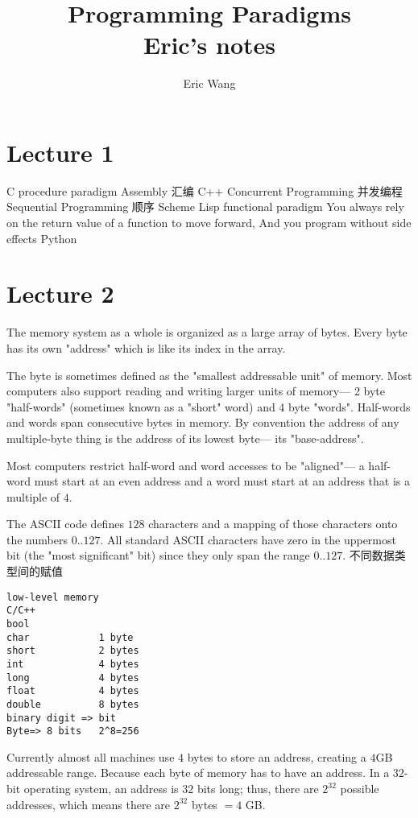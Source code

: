\documentclass{article}
\begin{document}
\title{Programming Paradigms\\ Eric's notes}
\author{Eric Wang}
\maketitle
\newpage
\tableofcontents
\newpage
\section{Lecture 1}
C procedure paradigm
Assembly 汇编
C++
Concurrent Programming 并发编程
Sequential Programming 顺序
Scheme Lisp functional paradigm
You always rely on the return value of a function to move forward, And you program without side effects
Python
\section{Lecture 2}
The memory system as a whole is organized as a large array of bytes. Every byte has its
own "address" which is like its index in the array.

The byte is sometimes defined as the "smallest addressable unit" of memory. Most computers also support reading and writing larger units of memory— 2 byte "half-words" (sometimes known as a "short" word) and 4 byte "words".
Half-words and words span consecutive bytes in memory. By convention the address of any multiple-byte thing is the address of its lowest byte— its "base-address".

Most computers restrict half-word and word accesses to be "aligned"— 
a half-word must start at an even address and 
a word must start at an address that is a multiple of $4$.

The ASCII code defines $128$ characters and a mapping of those characters onto the numbers $0..127$.
All standard ASCII characters have zero in the uppermost bit (the "most significant" bit) since they only span the range $0..127$.
不同数据类型间的赋值
\begin{verbatim}
low-level memory
C/C++
bool
char            1 byte
short           2 bytes
int             4 bytes
long            4 bytes
float           4 bytes
double        	8 bytes
binary digit => bit
Byte=> 8 bits   2^8=256
\end{verbatim}
Currently almost all machines use $4$ bytes to store an address, creating a $4$GB addressable range.
Because each byte of memory has to have an address. In a $32$-bit operating system, an address is $32$ bits long; thus, there are $2^32$ possible addresses, which means there are $2^32$ bytes $= 4$ GB.
\end{document}

